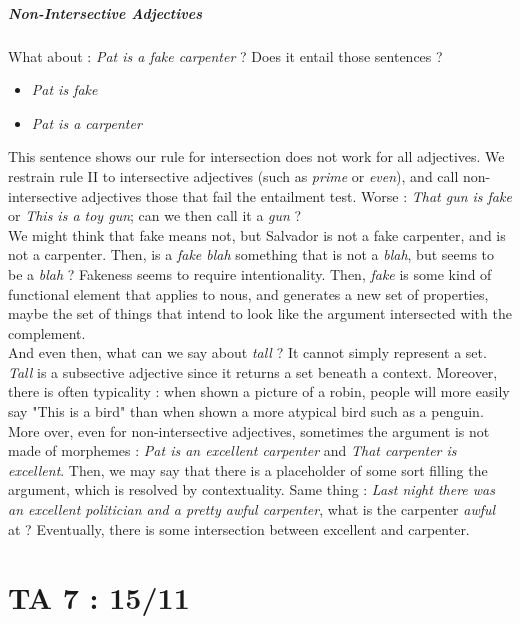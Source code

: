 \documentclass{cours}
\begin{document}
\subsubsection{Non-Intersective Adjectives}
What about : \textsl{Pat is a fake carpenter} ? Does it entail those sentences ?
\begin{itemize}
    \item \textsl{Pat is fake}
    \item \textsl{Pat is a carpenter}
\end{itemize}
This sentence shows our rule for intersection does not work for all adjectives. We restrain rule II to intersective adjectives (such as \textsl{prime} or \textsl{even}), and call non-intersective adjectives those that fail the entailment test. Worse : \textsl{That gun is fake} or \textsl{This is a toy gun}; can we then call it a \textsl{gun} ?\\
We might think that fake means not, but Salvador is not a fake carpenter, and is not a carpenter. Then, is a \textsl{fake blah} something that is not a \textsl{blah}, but seems to be a \textsl{blah} ? Fakeness seems to require intentionality. Then, \textsl{fake} is some kind of functional element that applies to nous, and generates a new set of properties, maybe the set of things that intend to look like the argument intersected with the complement.\\
And even then, what can we say about \textsl{tall} ? It cannot simply represent a set. \textsl{Tall} is a subsective adjective since it returns a set beneath a context. Moreover, there is often typicality : when shown a picture of a robin, people will more easily say "This is a bird" than when shown a more atypical bird such as a penguin.\\
More over, even for non-intersective adjectives, sometimes the argument is not made of morphemes : \textsl{Pat is an excellent carpenter} and \textsl{That carpenter is excellent}. Then, we may say that there is a placeholder of some sort filling the argument, which is resolved by contextuality. Same thing : \textsl{Last night there was an excellent politician and a pretty awful carpenter}, what is the carpenter \textsl{awful} at ? Eventually, there is some intersection between excellent and carpenter.


\part{TA 7 : 15/11}
\end{document}

